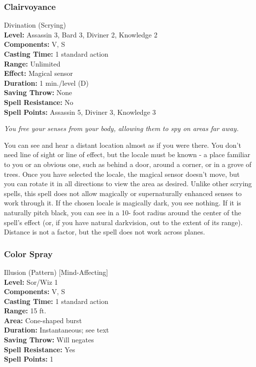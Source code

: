 \subsubsection{Clairvoyance}
\label{Spell:Clairvoyance}
Divination (Scrying)
\\ \textbf{Level:} Assassin 3, Bard 3, Diviner 2, Knowledge 2
\\ \textbf{Components:} V, S
\\ \textbf{Casting Time:} 1 standard action
\\ \textbf{Range:} Unlimited
\\ \textbf{Effect:} Magical sensor
\\ \textbf{Duration:} 1 min./level (D)
\\ \textbf{Saving Throw:} None
\\ \textbf{Spell Resistance:} No
\\ \textbf{Spell Points:} Assassin 5, Diviner 3, Knowledge 3

\emph{You free your senses from your body, allowing them to spy on areas far away.}

You can see and hear a distant location almost as if you were there. 
You don't need line of sight or line of effect, but the locale must be known - 
a place familiar to you or an obvious one, such as behind a door, around a corner, or in a grove of trees. 
Once you have selected the locale, the magical sensor doesn't move, but you can rotate it in all directions to view the area as desired. 
Unlike other scrying spells, this spell does not allow magically or supernaturally enhanced senses to work through it.
If the chosen locale is magically dark, you see nothing. 
If it is naturally pitch black, 
you can see in a 10- foot radius around the center of the spell's effect (or, if you have natural darkvision, out to the extent of its range). 
Distance is not a factor, but the spell does not work across planes.

\subsubsection{Color Spray}
\label{Spell:ColorSpray}
Illusion (Pattern) [Mind-Affecting]
\\ \textbf{Level:} Sor/Wiz 1
\\ \textbf{Components:} V, S
\\ \textbf{Casting Time:} 1 standard action
\\ \textbf{Range:} 15 ft.
\\ \textbf{Area:} Cone-shaped burst
\\ \textbf{Duration:} Instantaneous; see text
\\ \textbf{Saving Throw:} Will negates
\\ \textbf{Spell Resistance:} Yes
\\ \textbf{Spell Points:} 1

